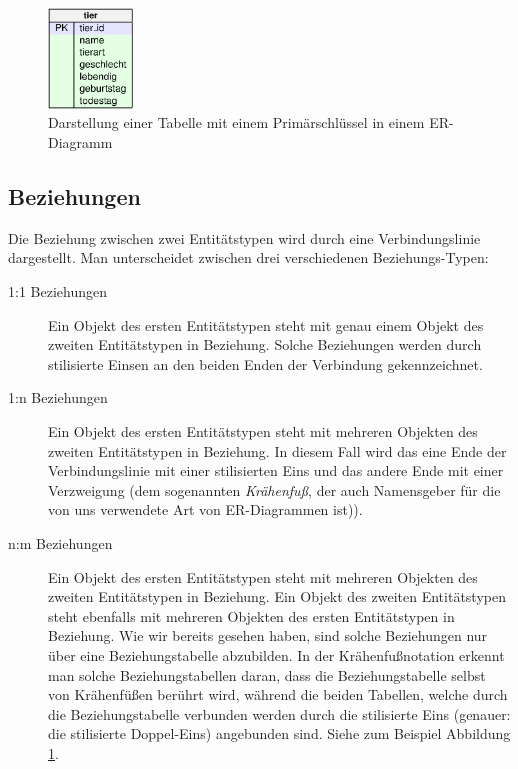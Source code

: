 \begin{figure}[h]
  \centering
   \includegraphics[width=0.20\textwidth]{./inf/SEKII/34_SQL_ER-Diagramme/ermTier}
   \caption{Darstellung einer Tabelle mit einem Primärschlüssel in einem
   ER-Diagramm}
   \label{fig:erstes-er-diagramm}
\end{figure}

\subsection{Beziehungen}

Die Beziehung zwischen zwei Entitätstypen wird durch eine Verbindungslinie
dargestellt. Man unterscheidet zwischen drei verschiedenen Beziehungs-Typen:

\begin{description}
\item[1:1 Beziehungen]
Ein Objekt des ersten Entitätstypen steht mit genau einem Objekt des zweiten
Entitätstypen in Beziehung. Solche Beziehungen werden durch stilisierte Einsen
an den beiden Enden der Verbindung gekennzeichnet.

\item[1:n Beziehungen]
Ein Objekt des ersten Entitätstypen steht mit mehreren Objekten des zweiten
Entitätstypen in Beziehung. In diesem Fall wird das eine Ende der
Verbindungslinie mit einer stilisierten Eins und das andere Ende mit einer
Verzweigung (dem sogenannten \textit{Krähenfuß}, der auch Namensgeber für
die von uns verwendete Art von ER-Diagrammen ist)).

\item[n:m Beziehungen]
Ein Objekt des ersten Entitätstypen steht mit mehreren Objekten des zweiten
Entitätstypen in Beziehung. Ein Objekt des zweiten Entitätstypen steht ebenfalls
mit mehreren Objekten des ersten Entitätstypen in Beziehung. Wie wir bereits
gesehen haben, sind solche Beziehungen nur über eine Beziehungstabelle
abzubilden. In der Krähenfußnotation erkennt man solche Beziehungstabellen
daran, dass die Beziehungstabelle selbst von Krähenfüßen berührt wird, während
die beiden Tabellen, welche durch die Beziehungstabelle verbunden werden durch
die stilisierte Eins (genauer: die stilisierte Doppel-Eins) angebunden sind.
Siehe zum Beispiel Abbildung \ref{fig:erstes-er-diagramm}.
\end{description}

